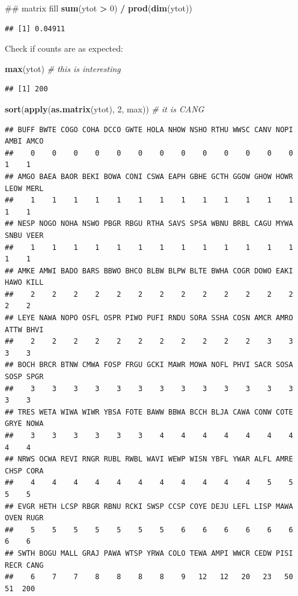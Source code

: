 \documentclass[12pt,]{book}
\newenvironment{Shaded}{\begin{snugshade}}{\end{snugshade}}
\newcommand{\CommentTok}[1]{\textcolor[rgb]{0.56,0.35,0.01}{\textit{#1}}}
\newcommand{\DecValTok}[1]{\textcolor[rgb]{0.00,0.00,0.81}{#1}}
\newcommand{\KeywordTok}[1]{\textcolor[rgb]{0.13,0.29,0.53}{\textbf{#1}}}
\newcommand{\NormalTok}[1]{#1}
\newcommand{\OperatorTok}[1]{\textcolor[rgb]{0.81,0.36,0.00}{\textbf{#1}}}
\newcommand{\StringTok}[1]{\textcolor[rgb]{0.31,0.60,0.02}{#1}}
\begin{document}
\begin{Shaded}
\begin{Highlighting}[]
\NormalTok{## matrix fill}
\KeywordTok{sum}\NormalTok{(ytot }\OperatorTok{>}\StringTok{ }\DecValTok{0}\NormalTok{) }\OperatorTok{/}\StringTok{ }\KeywordTok{prod}\NormalTok{(}\KeywordTok{dim}\NormalTok{(ytot))}
\end{Highlighting}
\end{Shaded}

\begin{verbatim}
## [1] 0.04911
\end{verbatim}

Check if counts are as expected:

\begin{Shaded}
\begin{Highlighting}[]
\KeywordTok{max}\NormalTok{(ytot) }\CommentTok{# this is interesting}
\end{Highlighting}
\end{Shaded}

\begin{verbatim}
## [1] 200
\end{verbatim}

\begin{Shaded}
\begin{Highlighting}[]
\KeywordTok{sort}\NormalTok{(}\KeywordTok{apply}\NormalTok{(}\KeywordTok{as.matrix}\NormalTok{(ytot), }\DecValTok{2}\NormalTok{, max)) }\CommentTok{# it is CANG}
\end{Highlighting}
\end{Shaded}

\begin{verbatim}
## BUFF BWTE COGO COHA DCCO GWTE HOLA NHOW NSHO RTHU WWSC CANV NOPI AMBI AMCO 
##    0    0    0    0    0    0    0    0    0    0    0    0    0    1    1 
## AMGO BAEA BAOR BEKI BOWA CONI CSWA EAPH GBHE GCTH GGOW GHOW HOWR LEOW MERL 
##    1    1    1    1    1    1    1    1    1    1    1    1    1    1    1 
## NESP NOGO NOHA NSWO PBGR RBGU RTHA SAVS SPSA WBNU BRBL CAGU MYWA SNBU VEER 
##    1    1    1    1    1    1    1    1    1    1    1    1    1    1    1 
## AMKE AMWI BADO BARS BBWO BHCO BLBW BLPW BLTE BWHA COGR DOWO EAKI HAWO KILL 
##    2    2    2    2    2    2    2    2    2    2    2    2    2    2    2 
## LEYE NAWA NOPO OSFL OSPR PIWO PUFI RNDU SORA SSHA COSN AMCR AMRO ATTW BHVI 
##    2    2    2    2    2    2    2    2    2    2    2    3    3    3    3 
## BOCH BRCR BTNW CMWA FOSP FRGU GCKI MAWR MOWA NOFL PHVI SACR SOSA SOSP SPGR 
##    3    3    3    3    3    3    3    3    3    3    3    3    3    3    3 
## TRES WETA WIWA WIWR YBSA FOTE BAWW BBWA BCCH BLJA CAWA CONW COTE GRYE NOWA 
##    3    3    3    3    3    3    4    4    4    4    4    4    4    4    4 
## NRWS OCWA REVI RNGR RUBL RWBL WAVI WEWP WISN YBFL YWAR ALFL AMRE CHSP CORA 
##    4    4    4    4    4    4    4    4    4    4    4    5    5    5    5 
## EVGR HETH LCSP RBGR RBNU RCKI SWSP CCSP COYE DEJU LEFL LISP MAWA OVEN RUGR 
##    5    5    5    5    5    5    5    6    6    6    6    6    6    6    6 
## SWTH BOGU MALL GRAJ PAWA WTSP YRWA COLO TEWA AMPI WWCR CEDW PISI RECR CANG 
##    6    7    7    8    8    8    8    9   12   12   20   23   50   51  200
\end{verbatim}
\end{document}
